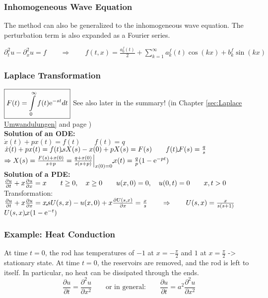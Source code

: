 \subsubsection{Inhomogeneous Wave Equation}

The method can also be generalized to the inhomogeneous wave equation. The perturbation term is also expanded as a Fourier series.

$\partial_t^2u-\partial_x^2u=f \qquad \Rightarrow \qquad f(t,x)=\frac{a_0^f(t)}{2}+\sum\limits_{k=1}^{\infty}{a^f_k(t)\cos(kx)+b^f_k\sin(kx)}$

\subsubsection{Laplace Transformation}

$\boxed{F(t)=\int\limits_{0}^{\infty}{f(t)\mathrm{e}^{-st}} dt}$ \qquad See also later in the summary! (in Chapter \ref{sec:Laplace Umwandulungen} and page \pageref{sec:Laplace Umwandulungen})\\

\textbf{Solution of an ODE:}\\

$\dot{x}(t)+p x(t)=f(t) \qquad f(t)=q$\\
$\dot{x}(t)+p x(t)=f(t)\FT s X(s)-x(0)+pX(s)=F(s) \qquad f(t)\FT F(s)=\frac{q}{s}$\\

$\Rightarrow X(s)=\frac{F(s)+x(0)}{s+p}=\frac{q+x(0)}{s(s+p)}\Big|_{x(0)=0}\IFT x(t)=\frac{q}{p}(1-\e^{-pt})$\\

\textbf{Solution of a PDE:}\\

$\frac{\partial u}{\partial t}+x\frac{\partial u}{\partial x}=x\qquad t\geq 0,\quad x\geq 0\qquad u(x,0)=0,\quad u(0,t)=0\qquad x,t>0$\\

Transformation: $\partFrac{u}{t}+x\partFrac{u}{x}=x\FT sU(s,x)-u(x,0)+x\partFrac{U(s,x)}{x}=\frac{x}{s}\qquad \Rightarrow \qquad U(s,x)=\frac{x}{s(s+1)}$\\
$U(s,x)\IFT x(1-\e^{-t})$

\subsubsection{Example: Heat Conduction}

At time $t=0$, the rod has temperatures of $-1$ at $x=-\frac{\pi}2$ and
$1$ at $x=\frac{\pi}2$ -> stationary state.
At time $t=0$, the reservoirs are removed, and the rod is left to itself. In particular, no heat can be dissipated through the ends.
\[
\frac{\partial u}{\partial t}=\frac{\partial^2 u}{\partial x^2} \qquad \text{or in general:} \qquad \frac{\partial u}{\partial t}= a^2 \frac{\partial^2 u}{\partial x^2}
\]

